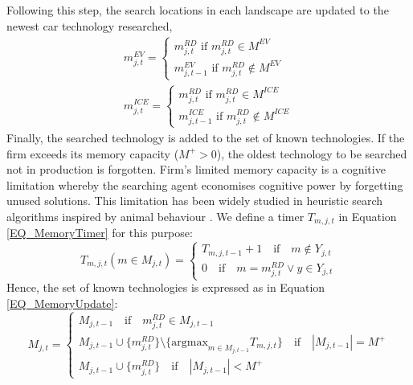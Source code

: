 \documentclass[12pt]{article}
\begin{document}
	Following this step, the search locations in each landscape are updated to the newest car technology researched,
	\begin{equation}
		\begin{aligned}
			m^{EV}_{j,t} = \begin{cases}
				m^{RD}_{j,t}\text{ if } m^{RD}_{j,t} \in M^{EV} \\
				m^{EV}_{j,t-1}\text{ if }m^{RD}_{j,t} \notin M^{EV}
			\end{cases} \\
			m^{ICE}_{j,t} = \begin{cases}
				m^{RD}_{j,t}\text{ if } m^{RD}_{j,t} \in M^{ICE} \\
				m^{ICE}_{j,t-1}\text{ if }m^{RD}_{j,t} \notin M^{ICE}
			\end{cases}
		\end{aligned}
		\label{EQ_SearchLocations}
	\end{equation}
	Finally, the searched technology is added to the set of known technologies. If the firm exceeds its memory capacity ($M^+>0$), the oldest technology to be searched not in production is forgotten. Firm's limited memory capacity is a cognitive limitation whereby the searching agent economises cognitive power by forgetting unused solutions. This limitation has been widely studied in heuristic search algorithms inspired by animal behaviour \citep{Tang_2012}. We define a timer $T_{m,j,t}$ in Equation \ref{EQ_MemoryTimer} for this purpose:
	\begin{equation}
		T_{m,j,t}(m\in{M_{j,t}}) = \begin{cases}
			T_{m,j,t-1} + 1\quad\text{if}\quad{m\notin{Y_{j,t}}}\\
			0\quad\text{if}\quad{m=m^{RD}_{j,t}\vee{y\in{Y_{j,t}}}}
		\end{cases}
		\label{EQ_MemoryTimer}
	\end{equation}
	Hence, the set of known technologies is expressed as in Equation \ref{EQ_MemoryUpdate}:
	\begin{equation}
		M_{j,t}=\begin{cases}
			M_{j,t-1}\quad\text{if}\quad m^{RD}_{j,t}\in  M_{j,t-1}\\
			M_{j,t-1}\cup\{m^{RD}_{j,t}\}\setminus\{\text{argmax}_{m\in{M_{j,t-1}}} T_{m,j,t}\}\quad\text{if}\quad|M_{j,t-1}|=M^+\\
			M_{j,t-1}\cup\{m^{RD}_{j,t}\}\quad\text{if}\quad|M_{j,t-1}|<M^+
		\end{cases}
		\label{EQ_MemoryUpdate}
	\end{equation}
	
\end{document}
